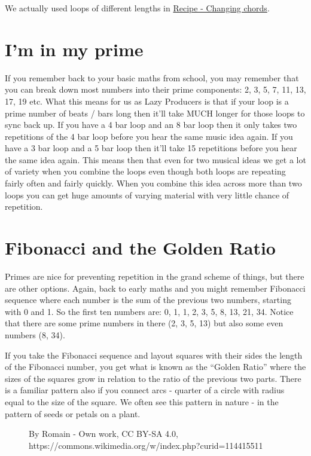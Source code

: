 \documentclass[
  12pt,
  letterpaper,
  oneside,
  open=any]{scrbook}
\makeatletter
\newcommand*\pandocbounded[1]{%
  \sbox\pandoc@box{#1}%
  \Gscale@div\@tempa{\textheight}{\dimexpr\ht\pandoc@box+\dp\pandoc@box\relax}%
  \Gscale@div\@tempb{\linewidth}{\wd\pandoc@box}%
  \ifdim\@tempb\p@<\@tempa\p@\let\@tempa\@tempb\fi%
  \ifdim\@tempa\p@<\p@\scalebox{\@tempa}{\usebox\pandoc@box}%
  \else\usebox{\pandoc@box}%
  \fi%
}
\makeatother
\begin{document}
We actually used loops of different lengths in
\hyperref[Chapter-001-Recipe-Changing_Chords]{Recipe - Changing chords}.

\section{I'm in my prime}\label{im-in-my-prime}

If you remember back to your basic maths from school, you may remember
that you can break down most numbers into their prime components: 2, 3,
5, 7, 11, 13, 17, 19 etc. What this means for us as Lazy Producers is
that if your loop is a prime number of beats / bars long then it'll take
MUCH longer for those loops to sync back up. If you have a 4 bar loop
and an 8 bar loop then it only takes two repetitions of the 4 bar loop
before you hear the same music idea again. If you have a 3 bar loop and
a 5 bar loop then it'll take 15 repetitions before you hear the same
idea again. This means then that even for two musical ideas we get a lot
of variety when you combine the loops even though both loops are
repeating fairly often and fairly quickly. When you combine this idea
across more than two loops you can get huge amounts of varying material
with very little chance of repetition.

\section{Fibonacci and the Golden
Ratio}\label{fibonacci-and-the-golden-ratio}

Primes are nice for preventing repetition in the grand scheme of things,
but there are other options. Again, back to early maths and you might
remember Fibonacci sequence where each number is the sum of the previous
two numbers, starting with 0 and 1. So the first ten numbers are: 0, 1,
1, 2, 3, 5, 8, 13, 21, 34. Notice that there are some prime numbers in
there (2, 3, 5, 13) but also some even numbers (8, 34).

If you take the Fibonacci sequence and layout squares with their sides
the length of the Fibonacci number, you get what is known as the
``Golden Ratio'' where the sizes of the squares grow in relation to the
ratio of the previous two parts. There is a familiar pattern also if you
connect arcs - quarter of a circle with radius equal to the size of the
square. We often see this pattern in nature - in the pattern of seeds or
petals on a plant.

\begin{figure}[H]

{\centering \pandocbounded{\texttt{[image: images/Fibonacci\_Spiral.png]}}

}

\caption{By Romain - Own work, CC BY-SA 4.0,
https://commons.wikimedia.org/w/index.php?curid=114415511}

\end{figure}%
\end{document}
